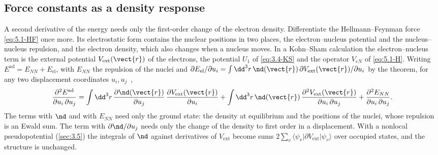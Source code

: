 \subsection{Force constants as a density response}

A second derivative of the energy needs only the first-order change of the electron density. Differentiate the Hellmann--Feynman force \cref{eq:5.1-HF} once more. Its electrostatic form contains the nuclear positions in two places, the electron--nucleus potential and the nucleus--nucleus repulsion, and the electron density, which also changes when a nucleus moves. In a Kohn--Sham calculation the electron--nucleus term is the external potential $V_{\mathrm{ext}}(\vect{r})$ of the electrons, the potential $U_1$ of \cref{eq:3.4-KS} and the operator $V_{eN}$ of \cref{eq:5.1-H}. Writing $E^{\mathrm{ad}} = E_{NN} + E_{\mathrm{el}}$, with $E_{NN}$ the repulsion of the nuclei and $\partial E_{\mathrm{el}}/\partial u_i = \int\dd^3r\,\nd(\vect{r})\,\partial V_{\mathrm{ext}}(\vect{r})/\partial u_i$ by the theorem, for any two displacement coordinates $u_i, u_j$~\cite[Eq.~(10)]{baroni2001phonons},
\begin{equation}
  \frac{\partial^2E^{\mathrm{ad}}}{\partial u_i\,\partial u_j}
  = \int\dd^3r\,\frac{\partial\nd(\vect{r})}{\partial u_j}\,\frac{\partial V_{\mathrm{ext}}(\vect{r})}{\partial u_i}
  + \int\dd^3r\,\nd(\vect{r})\,\frac{\partial^2V_{\mathrm{ext}}(\vect{r})}{\partial u_i\,\partial u_j}
  + \frac{\partial^2E_{NN}}{\partial u_i\,\partial u_j} .
  \label{eq:5.4-hess}
\end{equation}
The terms with $\nd$ and with $E_{NN}$ need only the ground state: the density at equilibrium and the positions of the nuclei, whose repulsion is an Ewald sum. The term with $\partial\nd/\partial u_j$ needs only the change of the density to first order in a displacement. With a nonlocal pseudopotential (\cref{sec:3.5}) the integrals of $\nd$ against derivatives of $V_{\mathrm{ext}}$ become sums $2\sum_v\langle\psi_v|\partial V_{\mathrm{ext}}|\psi_v\rangle$ over occupied states, and the structure is unchanged.

